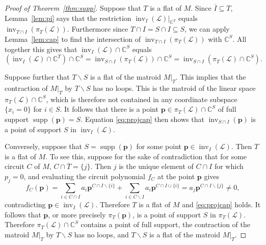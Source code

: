 \documentclass[ALCO,ThmDefs,Unicode,epreuves]{cedram}
\newcommand{\Cbb}{\mathbb{C}}
\newcommand{\cL}{\mathcal{L}}
\newcommand{\p}{\mathbf{p}}
\newcommand{\ol}{\overline}
\DeclareMathOperator{\inv}{inv}
\DeclareMathOperator{\supp}{supp}
\begin{document}
\begin{proof}[Proof of Theorem~\ref{thm:supp}]
Suppose that $T$ is a flat of $M$. Since $\ol{I}\subseteq T$, Lemma~\ref{lem:pi} says that
the restriction $\inv_I(\cL)\vert_{\Cbb^T}$ equals $\inv_{T \cap I}\left(\pi_{T}(\cL)\right)$.
Furthermore since $T\cap I = S \cap I \subseteq S$, we can apply Lemma~\ref{lem:cap} 
to find the intersection of $\inv_{T \cap I}\left(\pi_{T}(\cL)\right)$ with $\Cbb^S$. 
All together this gives that $\inv_I(\cL)\cap \Cbb^S$ equals 
\begin{equation}\label{eq:projcap}
(\inv_I(\cL)\cap\Cbb^T)\cap\Cbb^S = \inv_{S\cap I}\left(\pi_{T}(\cL)\right)\cap\Cbb^S = \inv_{S\cap I}\left(\pi_{T}(\cL)\cap \Cbb^S\right). 
\end{equation}

Suppose further that $T\backslash S$ is a flat of the matroid $M|_T$.
This implies that the contraction of $M|_T$ by $T\backslash S$ has no loops. This is the matroid 
of the linear space $\pi_T(\cL)\cap \Cbb^S$, which is therefore not contained in any coordinate subspace $\{x_i=0\}$ for $i\in S$. 
It follows that there is a point $\p\in \pi_T(\cL)\cap \Cbb^S$ of full support $\supp(\p) = S$. 
Equation \eqref{eq:projcap} then shows that $\inv_{S\cap I}(\p)$ is a point of support $S$ in $\inv_I(\cL)$.

Conversely, 
suppose that $S = \supp(\p)$ for some point $\p \in \inv_I(\cL)$. Then $T$ is a flat of $M$. 
To see this, suppose for the sake of contradiction that for some circuit $C$ of $M$, $C\cap\ol{T}=\{j\}$. 
 Then $j$ is the unique element of $C\cap I$ for which $p_j=0$, and 
 evaluating the circuit polynomial $f_C$ at the point $\p$ gives 
\[
f_C(\p) = \sum_{i\in C\cap I} a_i \p^{C\cap I\backslash\{ i\}} + \sum_{i\in C\backslash I } a_i \p^{C\cap I \cup\{ i\}}
 = a_j \p^{C\cap I\backslash\{ j\}} \neq 0,
\]
contradicting $\p\in \inv_I(\cL)$. Therefore $T$ is a flat of $M$ and \eqref{eq:projcap} holds. 
It follows that $\p$, or more precisely $\pi_T(\p)$, is a point of support $S$ in $\pi_T(\cL)$. 
Therefore $\pi_T(\cL)\cap\Cbb^S$ contains a point of full support, the contraction of the matroid $M|_T$ by $T\backslash S$ 
has no loops, and $T\backslash S$ is a flat of the matroid $M|_T$. 
\end{proof}
\end{document}
